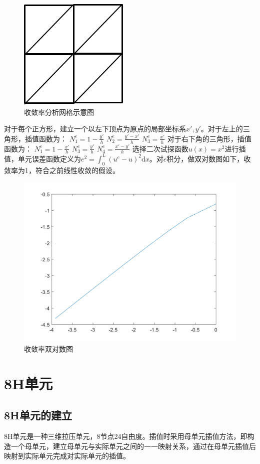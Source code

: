\documentclass{ctexart}
\begin{document}
\begin{figure}[H]
\centering  
\includegraphics[width = .4\textwidth]{t3_4.png} 
\caption{收敛率分析网格示意图} 
\label{f1.4} 
\end{figure}

对于每个正方形，建立一个以左下顶点为原点的局部坐标系$x', y'$。对于左上的三角形，插值函数为：
$ N_{1}^{e}=1-\frac{y'}{h} $
$ N_{2}^{e}=\frac{y'-x'}{h} $
$ N_{3}^{e}=\frac{x'}{h} $
对于右下角的三角形，插值函数为：
$ N_{1}^{e}=1-\frac{x'}{h} $
$ N_{3}^{e}=\frac{y'}{h} $
$ N_{4}^{e}=\frac{x'-y'}{h} $
选择二次试探函数$ u(x)=x^{2} $进行插值，单元误差函数定义为$ e^{2}=\int_{0}^{L}\left(u^{e}-u\right)^{2} \mathrm{d} x$。对$e$积分，做双对数图如下，收敛率为1，符合之前线性收敛的假设。

\begin{figure}[H]
\centering  
\includegraphics[width = .8\textwidth]{t3_5.png} 
\caption{收敛率双对数图} 
\label{f1.5} 
\end{figure}

\section{8H单元}
\subsection{8H单元的建立}
8H单元是一种三维拉压单元，8节点24自由度。插值时采用母单元插值方法，即构造一个母单元，建立母单元与实际单元之间的一一映射关系，通过在母单元插值后映射到实际单元完成对实际单元的插值。
\end{document}
